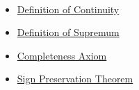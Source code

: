 \begin{remark*}[Dependencies]~\\
\begin{itemize}
  \item \hyperref[def:continuity]{Definition of Continuity}
  \item \hyperref[def:supremum]{Definition of Supremum}
  \item \hyperref[thm:completeness-axiom]{Completeness Axiom}
  \item \hyperref[thm:sign-preservation]{Sign Preservation Theorem}
\end{itemize}
\end{remark*}
